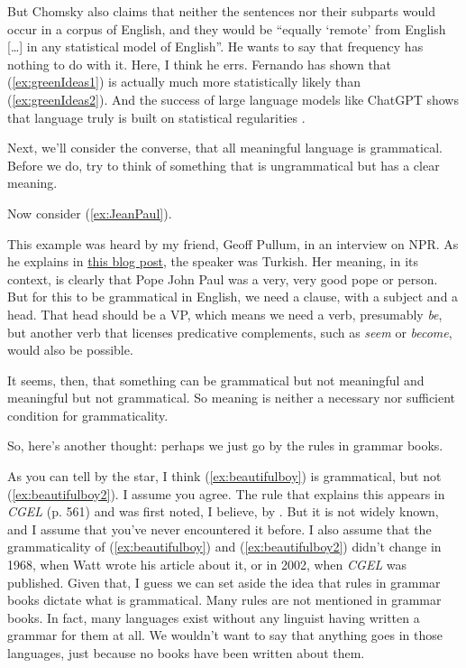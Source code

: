 But Chomsky also claims that neither the sentences nor their subparts would occur in a corpus of English, and they would be ``equally `remote' from English [\dots] in any statistical model of English''. He wants to say that frequency has nothing to do with it. Here, I think he errs. Fernando \textcite{Pereira2000} has shown that (\ref{ex:greenIdeas1}) is actually much more statistically likely than (\ref{ex:greenIdeas2}). And the success of large language models like ChatGPT shows that language truly is built on statistical regularities \citep{Kallini2024}.

Next, we'll consider the converse, that all meaningful language is grammatical. Before we do, try to think of something that is ungrammatical but has a clear meaning.

Now consider (\ref{ex:JeanPaul}).

\label{ex:JeanPaul}
\z

This example was heard by my friend, Geoff Pullum, in an interview on NPR. As he explains in \href{http://itre.cis.upenn.edu/~myl/languagelog/archives/003830.html}{this blog post}, the speaker was Turkish. Her meaning, in its context, is clearly that Pope John Paul was a very, very good pope or person. But for this to be grammatical in English, we need a clause, with a subject and a head. That head should be a VP, which means we need a verb, presumably \textit{be}, but another verb that licenses predicative complements, such as \textit{seem} or \textit{become}, would also be possible.

It seems, then, that something can be grammatical but not meaningful and meaningful but not grammatical. So meaning is neither a necessary nor sufficient condition for grammaticality.

So, here's another thought: perhaps we just go by the rules in grammar books.

\ea
    \label{ex:beautifulboy} 
    \label{ex:beautifulboy2}
    \z
\z

As you can tell by the star, I think (\ref{ex:beautifulboy}) is grammatical, but not (\ref{ex:beautifulboy2}). I assume you agree. The rule that explains this appears in \textit{CGEL} (p. 561) and was first noted, I believe, by \textcite{Watt1968}. But it is not widely known, and I assume that you've never encountered it before. I also assume that the grammaticality of (\ref{ex:beautifulboy}) and (\ref{ex:beautifulboy2}) didn't change in 1968, when Watt wrote his article about it, or in 2002, when \textit{CGEL} was published. Given that, I guess we can set aside the idea that rules in grammar books dictate what is grammatical. Many rules are not mentioned in grammar books. In fact, many languages exist without any linguist having written a grammar for them at all. We wouldn't want to say that anything goes in those languages, just because no books have been written about them.


